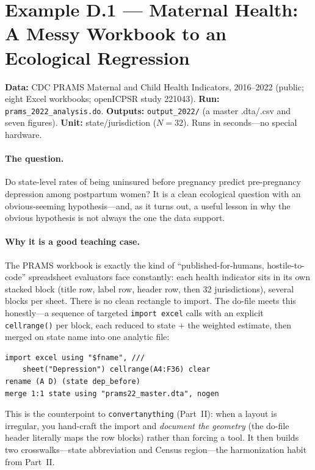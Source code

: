 \documentclass[
    a4paper,
    fontsize=10pt,
    twoside=true,
    numbers=noenddot,
]{kaobook}
\providecommand{\Option}[1]{\textsf{#1}}
\begin{document}
\section*{Example D.1 --- Maternal Health: A Messy Workbook to an Ecological Regression}\label{app:prams}
\begin{kaobox}[frametitle=Get the files: \texttt{221043-V2/}]
\textbf{Data:} CDC PRAMS Maternal and Child Health Indicators, 2016--2022 (public; eight Excel workbooks; openICPSR study 221043).
\textbf{Run:} \texttt{prams\_2022\_analysis.do}. \textbf{Outputs:} \texttt{output\_2022/} (a master \Option{.dta}/\Option{.csv} and seven figures).
\textbf{Unit:} state/jurisdiction ($N=32$). Runs in seconds---no special hardware.
\end{kaobox}

\paragraph{The question.} Do state-level rates of being uninsured before pregnancy predict pre-pregnancy depression among postpartum women? It is a clean ecological question with an obvious-seeming hypothesis---and, as it turns out, a useful lesson in why the obvious hypothesis is not always the one the data support.

\paragraph{Why it is a good teaching case.} The PRAMS workbook is exactly the kind of \enquote{published-for-humans, hostile-to-code} spreadsheet evaluators face constantly: each health indicator sits in its own stacked block (title row, label row, header row, then 32 jurisdictions), several blocks per sheet. There is no clean rectangle to import. The do-file meets this honestly---a sequence of targeted \texttt{import excel} calls with an explicit \texttt{cellrange()} per block, each reduced to state $+$ the weighted estimate, then merged on state name into one analytic file:
{\footnotesize
\begin{verbatim}
import excel using "$fname", ///
    sheet("Depression") cellrange(A4:F36) clear
rename (A D) (state dep_before)
merge 1:1 state using "prams22_master.dta", nogen
\end{verbatim}
}
This is the counterpoint to \texttt{convertanything} (Part~II): when a layout is irregular, you hand-craft the import and \emph{document the geometry} (the do-file header literally maps the row blocks) rather than forcing a tool. It then builds two crosswalks---state abbreviation and Census region---the harmonization habit from Part~II.
\end{document}
